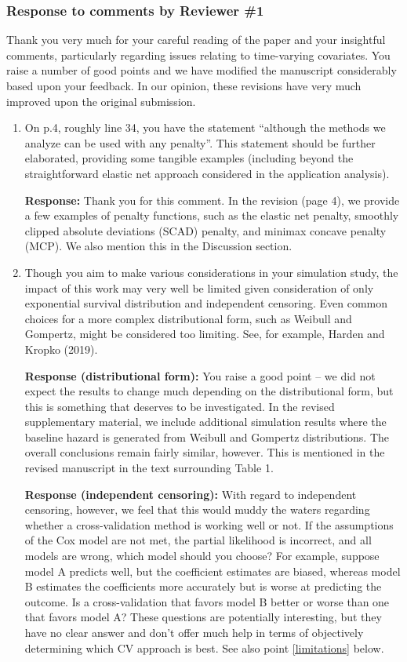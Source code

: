 \documentclass[12]{article}
\newcommand{\re}{\textbf{Response: }}
\begin{document}
\subsubsection*{Response to comments by Reviewer \#1}

Thank you very much for your careful reading of the paper and your insightful comments, particularly regarding issues relating to time-varying covariates. You raise a number of good points and we have modified the manuscript considerably based upon your feedback.  In our opinion, these revisions have very much improved upon the original submission.

\begin{enumerate}[align = left]
\item On p.4, roughly line 34, you have the statement “although the methods we analyze can be used with any penalty”.  This statement should be further elaborated, providing some tangible examples (including beyond the straightforward elastic net approach considered in the application analysis).

\re Thank you for this comment. In the revision (page 4), we provide a few examples of penalty functions, such as the elastic net penalty, smoothly clipped absolute deviations (SCAD) penalty, and minimax concave penalty (MCP). We also mention this in the Discussion section.

\item Though you aim to make various considerations in your simulation study, the impact of this work may very well be limited given consideration of only exponential survival distribution and independent censoring. Even common choices for a more complex distributional form, such as Weibull and Gompertz, might be considered too limiting. See, for example, Harden and Kropko (2019).

\textbf{Response (distributional form):} You raise a good point -- we did not expect the results to change much depending on the distributional form, but this is something that deserves to be investigated. In the revised supplementary material, we include additional simulation results where the baseline hazard is generated from Weibull and Gompertz distributions. The overall conclusions remain fairly similar, however. This is mentioned in the revised manuscript in the text surrounding Table 1.

\textbf{Response (independent censoring):} With regard to independent censoring, however, we feel that this would muddy the waters regarding whether a cross-validation method is working well or not. If the assumptions of the Cox model are not met, the partial likelihood is incorrect, and all models are wrong, which model should you choose? For example, suppose model A predicts well, but the coefficient estimates are biased, whereas model B estimates the coefficients more accurately but is worse at predicting the outcome. Is a cross-validation that favors model B better or worse than one that favors model A? These questions are potentially interesting, but they have no clear answer and don't offer much help in terms of objectively determining which CV approach is best. See also point \ref{limitations} below.


\end{enumerate}
\end{document}
